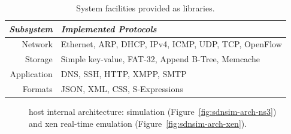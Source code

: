 \begin{table}
\centering
\begin{tabular}{r|p{}}
\emph{Subsystem} & \emph{Implemented Protocols} \\
\hline 
Network     & Ethernet, ARP, DHCP, IPv4, ICMP, UDP, TCP, OpenFlow\\ 
Storage     & Simple key-value, FAT-32, Append B-Tree, Memcache \\
Application & DNS, SSH, HTTP, XMPP, SMTP  \\ 
Formats     & JSON, XML, CSS, S-Expressions\\
\end{tabular}
\caption{\label{t:facilities}System facilities provided as \mirage{}
        libraries.}
\end{table}

\begin{figure}[ht] 
\centering
{}
\caption[\sdnsim host internal architecture]{\sdnsim host internal architecture: 
  simulation (Figure~\ref{fig:sdnsim-arch-ns3}) and xen real-time
  emulation (Figure~\ref{fig:sdnsim-arch-xen}).}
\label{fig:sdnsim-arch}
\end{figure}


